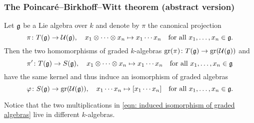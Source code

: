 \subsubsection{The Poincar\'{e}--Birkhoff--Witt theorem (abstract version)}


\begin{thrm} \label{thrm: pbw abstract}
 Let $\mathfrak{g}$ be a Lie algebra over $k$ and denote by $\pi$ the canonical projection
 \[
  \pi \colon T(\mathfrak{g}) \to \mathcal{U}(\mathfrak{g}), \quad
  x_1 \otimes \dotsb \otimes x_n \mapsto x_1 \dotsm x_n
  \quad \text{for all $x_1, \dotsc, x_n \in \mathfrak{g}$}.
 \]
 Then the two homomorphisms of graded $k$-algebras $\operatorname{gr}(\pi) \colon T(\mathfrak{g}) \to \operatorname{gr}(\mathcal{U}(\mathfrak{g}))$ and
 \[
  \pi' \colon T(\mathfrak{g}) \to S(\mathfrak{g}), \quad 
  x_1 \otimes \dotsb \otimes x_n \mapsto x_1 \dotsm x_n
  \quad \text{for all $x_1, \dotsc, x_n \in \mathfrak{g}$}
 \]
 have the same kernel and thus induce an isomorphism of graded algebras
 \begin{equation}\label{eqn: induced isomorphism of graded algebras}
  \varphi \colon S(\mathfrak{g}) \to \operatorname{gr}(\mathcal{U}(\mathfrak{g})), \quad
  x_1 \dotsm x_n \mapsto [x_1 \dotsm x_n]
  \quad \text{for all $x_1, \dotsc, x_n \in \mathfrak{g}$}.
 \end{equation}
\end{thrm}


\begin{rem}
 Notice that the two multiplications in \eqref{eqn: induced isomorphism of graded algebras} live in different $k$-algebras.
\end{rem}


